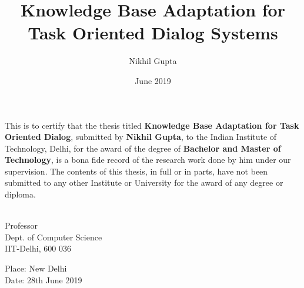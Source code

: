 \documentclass[Dual]{iitddiss}
\begin{document}


\title{Knowledge Base Adaptation for \\ Task Oriented Dialog Systems}

\author{Nikhil Gupta}
\date{June 2019}

\maketitle


\certificate

\vspace*{0.5in}

\noindent This is to certify that the thesis titled {\bf Knowledge Base Adaptation for Task Oriented Dialog}, submitted by {\bf Nikhil Gupta},
  to the Indian Institute of Technology, Delhi, for
the award of the degree of {\bf Bachelor and Master of Technology}, is a bona fide
record of the research work done by him under our supervision.  The
contents of this thesis, in full or in parts, have not been submitted
to any other Institute or University for the award of any degree or
diploma.

\vspace*{1.5in}

\begin{singlespacing}
\hspace*{-0.25in}
\parbox{2.5in}{
 \\
\noindent Professor \\
\noindent Dept. of Computer Science\\
\noindent IIT-Delhi, 600 036 \\
}
\hspace*{1.0in}
\end{singlespacing}
\vspace*{0.25in}
\noindent Place: New Delhi\\
Date: 28th June 2019


\acknowledgements

\pagebreak

\end{document}
